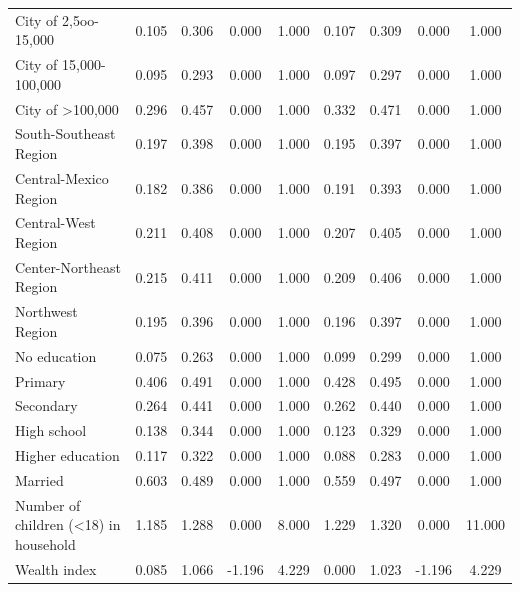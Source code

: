 \documentclass[12pt,english,british]{article}
\begin{document}
\begin{table}[h!]
\begin{center}
{{\begin{tabular}{l*{2}{cccc}}
City of 2,5oo-15,000&       0.105&       0.306&       0.000&       1.000&       0.107&       0.309&       0.000&       1.000\\
City of 15,000-100,000&       0.095&       0.293&       0.000&       1.000&       0.097&       0.297&       0.000&       1.000\\
City of >100,000    &       0.296&       0.457&       0.000&       1.000&       0.332&       0.471&       0.000&       1.000\\
South-Southeast Region&       0.197&       0.398&       0.000&       1.000&       0.195&       0.397&       0.000&       1.000\\
Central-Mexico Region&       0.182&       0.386&       0.000&       1.000&       0.191&       0.393&       0.000&       1.000\\
Central-West Region &       0.211&       0.408&       0.000&       1.000&       0.207&       0.405&       0.000&       1.000\\
Center-Northeast Region&       0.215&       0.411&       0.000&       1.000&       0.209&       0.406&       0.000&       1.000\\
Northwest Region    &       0.195&       0.396&       0.000&       1.000&       0.196&       0.397&       0.000&       1.000\\
No education        &       0.075&       0.263&       0.000&       1.000&       0.099&       0.299&       0.000&       1.000\\
Primary             &       0.406&       0.491&       0.000&       1.000&       0.428&       0.495&       0.000&       1.000\\
Secondary           &       0.264&       0.441&       0.000&       1.000&       0.262&       0.440&       0.000&       1.000\\
High school         &       0.138&       0.344&       0.000&       1.000&       0.123&       0.329&       0.000&       1.000\\
Higher education    &       0.117&       0.322&       0.000&       1.000&       0.088&       0.283&       0.000&       1.000\\
Married             &       0.603&       0.489&       0.000&       1.000&       0.559&       0.497&       0.000&       1.000\\
Number of children (<18) in household&       1.185&       1.288&       0.000&       8.000&       1.229&       1.320&       0.000&      11.000\\
Wealth index        &       0.085&       1.066&      -1.196&       4.229&       0.000&       1.023&      -1.196&       4.229\\

\end{tabular}}}
\end{center}
\end{table}
\end{document}
